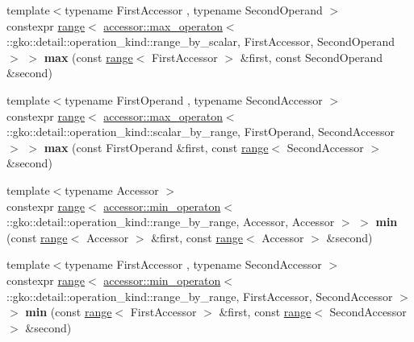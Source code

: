\begin{DoxyCompactItemize}
\item 
\mbox{\label{namespacegko_a12db47e6880294113f8cfc3b260b5c44}} 
{\footnotesize template$<$typename First\+Accessor , typename Second\+Operand $>$ }\\constexpr \hyperlink{classgko_1_1range}{range}$<$ \hyperlink{structgko_1_1accessor_1_1max__operaton}{accessor\+::max\+\_\+operaton}$<$ \+::gko\+::detail\+::operation\+\_\+kind\+::range\+\_\+by\+\_\+scalar, First\+Accessor, Second\+Operand $>$ $>$ {\bfseries max} (const \hyperlink{classgko_1_1range}{range}$<$ First\+Accessor $>$ \&first, const Second\+Operand \&second)
\item 
\mbox{\label{namespacegko_a4e1cf347b60113f5504144cf885be230}} 
{\footnotesize template$<$typename First\+Operand , typename Second\+Accessor $>$ }\\constexpr \hyperlink{classgko_1_1range}{range}$<$ \hyperlink{structgko_1_1accessor_1_1max__operaton}{accessor\+::max\+\_\+operaton}$<$ \+::gko\+::detail\+::operation\+\_\+kind\+::scalar\+\_\+by\+\_\+range, First\+Operand, Second\+Accessor $>$ $>$ {\bfseries max} (const First\+Operand \&first, const \hyperlink{classgko_1_1range}{range}$<$ Second\+Accessor $>$ \&second)
\item 
\mbox{\label{namespacegko_a92f6a1d8d6ddb53fa5604c4fffab2215}} 
{\footnotesize template$<$typename Accessor $>$ }\\constexpr \hyperlink{classgko_1_1range}{range}$<$ \hyperlink{structgko_1_1accessor_1_1min__operaton}{accessor\+::min\+\_\+operaton}$<$ \+::gko\+::detail\+::operation\+\_\+kind\+::range\+\_\+by\+\_\+range, Accessor, Accessor $>$ $>$ {\bfseries min} (const \hyperlink{classgko_1_1range}{range}$<$ Accessor $>$ \&first, const \hyperlink{classgko_1_1range}{range}$<$ Accessor $>$ \&second)
\item 
\mbox{\label{namespacegko_aed7f057eac94682a4aa2735af799e56a}} 
{\footnotesize template$<$typename First\+Accessor , typename Second\+Accessor $>$ }\\constexpr \hyperlink{classgko_1_1range}{range}$<$ \hyperlink{structgko_1_1accessor_1_1min__operaton}{accessor\+::min\+\_\+operaton}$<$ \+::gko\+::detail\+::operation\+\_\+kind\+::range\+\_\+by\+\_\+range, First\+Accessor, Second\+Accessor $>$ $>$ {\bfseries min} (const \hyperlink{classgko_1_1range}{range}$<$ First\+Accessor $>$ \&first, const \hyperlink{classgko_1_1range}{range}$<$ Second\+Accessor $>$ \&second)

\end{DoxyCompactItemize}
